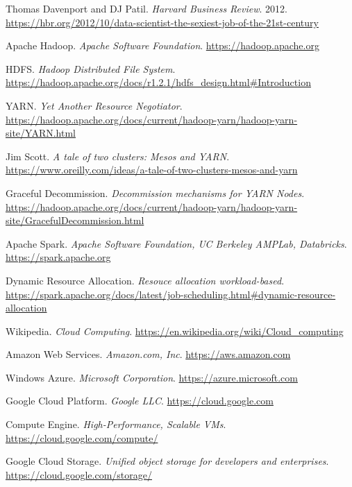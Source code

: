 \documentclass[12pt,twoside,cucitura]{toptesi}
\begin{document}
\renewcommand\bibname{References}
\begin{thebibliography}{9}

Thomas Davenport and DJ Patil. 
\textit{Harvard Business Review}. 2012.
\url{https://hbr.org/2012/10/data-scientist-the-sexiest-job-of-the-21st-century}

Apache Hadoop. 
\textit{Apache Software Foundation}.
\url{https://hadoop.apache.org}

HDFS. 
\textit{Hadoop Distributed File System}.
\url{https://hadoop.apache.org/docs/r1.2.1/hdfs\_design.html\#Introduction}

YARN. 
\textit{Yet Another Resource Negotiator}.
\url{https://hadoop.apache.org/docs/current/hadoop-yarn/hadoop-yarn-site/YARN.html}

Jim Scott. 
\textit{A tale of two clusters: Mesos and YARN}.
\url{https://www.oreilly.com/ideas/a-tale-of-two-clusters-mesos-and-yarn}

Graceful Decommission. 
\textit{Decommission mechanisms for YARN Nodes}.
\url{https://hadoop.apache.org/docs/current/hadoop-yarn/hadoop-yarn-site/GracefulDecommission.html}

Apache Spark. 
\textit{Apache Software Foundation, UC Berkeley AMPLab, Databricks}.
\url{https://spark.apache.org}

Dynamic Resource Allocation. 
\textit{Resouce allocation workload-based}.
\url{https://spark.apache.org/docs/latest/job-scheduling.html#dynamic-resource-allocation}

Wikipedia. 
\textit{Cloud Computing}.
\url{https://en.wikipedia.org/wiki/Cloud_computing}

Amazon Web Services. 
\textit{Amazon.com, Inc}.
\url{https://aws.amazon.com}

Windows Azure. 
\textit{Microsoft Corporation}.
\url{https://azure.microsoft.com}

Google Cloud Platform. 
\textit{Google LLC}.
\url{https://cloud.google.com}

Compute Engine. 
\textit{High-Performance, Scalable VMs}.
\url{https://cloud.google.com/compute/}

Google Cloud Storage. 
\textit{Unified object storage for developers and enterprises}.
\url{https://cloud.google.com/storage/}


\end{thebibliography}
\end{document}

